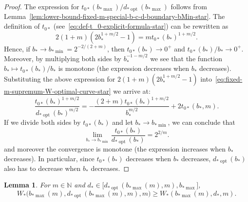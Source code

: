 \documentclass[a4paper]{amsart} %
\newtheorem{lemma}[theorem]{Lemma}
\theoremstyle{definition}
\theoremstyle{remark}
\numberwithin{equation}{section}
\newcommand*{\NNone}{\mathbb{N}}
\newcommand*{\bStar}{b_*}
\newcommand*{\dStar}{d_*}
\newcommand*{\tZeroStar}{t_{0*}}
\newcommand*{\XXXspecialbdStar}{W_*}
\newcommand*{\bMinStar}{b_{*\!\min}}
\newcommand*{\bMaxStar}{b_{*\!\max}}
\newcommand*{\dOptStar}{d_{*\!\operatorname{opt}}}
\begin{document}
\begin{proof}
	The expression for  $\tZeroStar(\bMaxStar)/\dOptStar(\bMaxStar)$ 
	follows from Lemma~\ref{lem:lower-bound-fixed-m-special-b-c-d-boundary-bMin-star}.
	The definition of $\tZeroStar$ (see~\eqref{eq:def-t_0-explicit-formula-star}) 
	can be rewritten as
	\[
	2(1+m) (2\bStar^{1+m/2}  -1 ) = m  \tZeroStar(\bStar)^{1+m/2}.
	\]
	Hence, if $\bStar\to \bMinStar = 2^{-2/(2+m)}$, then $\tZeroStar(\bStar) \to 0^+$ and $\tZeroStar(\bStar)/\bStar\to 0^+$.
	Moreover, by multiplying both sides by $\bStar^{-1-m/2}$ we see that the function $\bStar\mapsto \tZeroStar(\bStar)/\bStar$ is monotone (the expression decreases when $\bStar$ decreases).
	Substituting the above expression for $2(1+m)(2\bStar^{1+m/2} - 1)$
	into~\eqref{eq:fixed-m-supremum-W-optimal-curve-star} we arrive at:
	\begin{equation*}
	\frac{ \tZeroStar(\bStar)^{1+m/2}}{ \dOptStar(\bStar)^{m/2}}
	= -\frac{(2+m)\tZeroStar(\bStar)^{1+m/2}}{\bStar^{m/2}}   
	+ 2 \tZeroStar(\bStar,m). 
	\end{equation*}
	If we divide both sides by $\tZeroStar(\bStar)$ and let $\bStar\to \bMinStar$, we can conclude that 
	\[
	\lim_{\bStar\to\bMinStar}\frac{\tZeroStar(\bStar)}{\dOptStar(\bStar)}
	= 2^{2/m}.
	\]
	and moreover the convergence is monotone (the expression increases when $\bStar$ decreases).
	In particular, since $\tZeroStar(\bStar)$ decreases when $\bStar$ decreases, $\dOptStar(\bStar)$ also has to  decrease when $\bStar$ decreases. 
\end{proof}	




\begin{lemma}
	\label{lem:lower-bound-fixed-m-special-b-c-d-boundary-bMin-part-2-star}
	For $m\in\NNone$ and $\dStar\in \bigl[ \dOptStar(\bMaxStar(m),m), \bMaxStar\bigr]$,
	\begin{equation}
	\label{eq:claim-W-boundary-star}
	\XXXspecialbdStar\bigl(\bMaxStar(m), \dOptStar(\bMaxStar(m),m), m\bigr)
	\geq 
	\XXXspecialbdStar(\bMaxStar(m), \dStar, m) .
	\end{equation}
\end{lemma}
\end{document}
